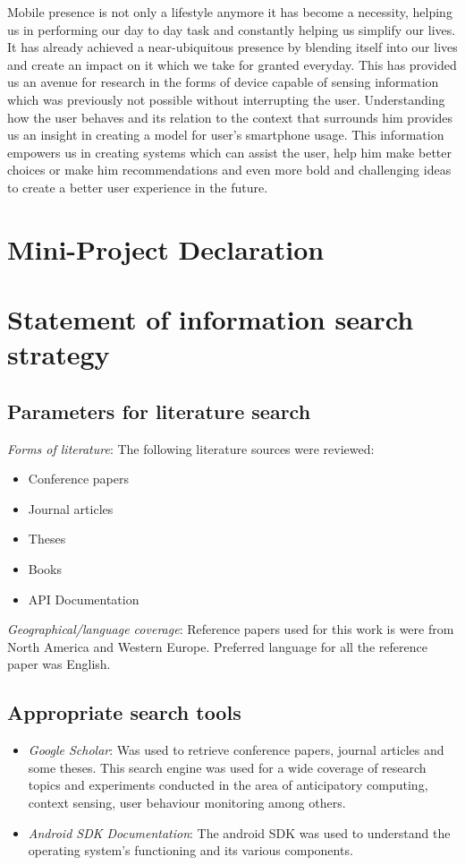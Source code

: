 \documentclass[12pt]{report}
\begin{document}
Mobile presence is not only a lifestyle anymore it has become a necessity, helping us in performing our day to day task and constantly helping us simplify our lives. It has already achieved a near-ubiquitous presence by blending itself into our lives and create an impact on it which we take for granted everyday. This has provided us an avenue for research in the forms of device capable of sensing information which was previously not possible without interrupting the user. Understanding how the user behaves and its relation to the context that surrounds him provides us an insight in creating a model for user's smartphone usage. This information empowers us in creating systems which can assist the user, help him make better choices or make him recommendations and even more bold and challenging ideas to create a better user experience in the future.
 



\appendix
\chapter{Mini-Project Declaration}


\chapter{Statement of information search strategy}
\section{Parameters for literature search}
\textit{Forms of literature}: The following literature sources were reviewed:
\begin{itemize}
\item Conference papers
\item Journal articles
\item Theses
\item Books
\item API Documentation
\end{itemize}

\textit{Geographical/language coverage}: Reference papers used for this work is were from North America and Western Europe. Preferred language for all the reference paper was English.
\section{Appropriate search tools}
\begin{itemize}
\item \textit{Google Scholar}: 
Was used to retrieve conference papers, journal articles and some theses. This search engine was used for a wide coverage of research topics and experiments conducted in the area of anticipatory computing, context sensing, user behaviour monitoring among others.
\item \textit{Android SDK Documentation}: The android SDK was used to understand the operating system's functioning and its various components.
\end{itemize}
\end{document}
